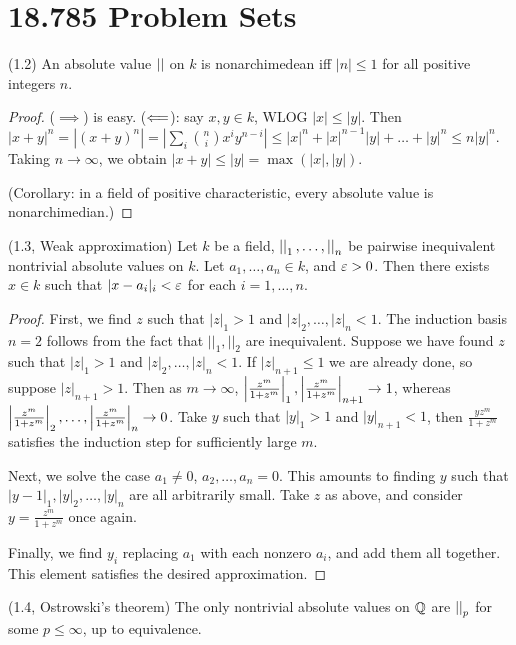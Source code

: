 \documentclass[11pt]{amsart}
\begin{document}
\newpage


\section*{18.785 Problem Sets}


(1.2) An absolute value $\left |  \right |$ on $k$ is nonarchimedean iff $|n|\le 1$ for all positive integers $n$.

\begin{proof}
($\implies$) is easy. ($\Longleftarrow$): say $x,y\in k$, WLOG $|x| \le |y|$. Then $|x+y|^n = |(x+y)^n| = |\sum_i \binom{n}{i} x^i y^{n-i}| \le |x|^n + |x|^{n-1}|y| + \dots + |y|^n \le n|y|^n$. Taking $n\to\infty$, we obtain $|x+y| \le |y| = \max(|x|, |y|)$.

(Corollary: in a field of positive characteristic, every absolute value is nonarchimedian.)
\end{proof}


(1.3, Weak approximation)
Let $k$ be a field, $\left |  \right |_1,\dots, \left |  \right |_n$ be pairwise inequivalent nontrivial absolute values on $k$. Let $a_1,\dots,a_n\in k$, and $\varepsilon>0$. Then there exists $x\in k$ such that $|x-a_i|_i < \varepsilon$ for each $i=1,\dots,n$.

\begin{proof}
First, we find $z$ such that $|z|_1>1$ and $|z|_2,\dots,|z|_n < 1$. The induction basis $n = 2$ follows from the fact that $||_1, ||_2$ are inequivalent. Suppose we have found $z$ such that $|z|_1>1$ and $|z|_2,\dots,|z|_n < 1$. If $|z|_{n+1}\le 1$ we are already done, so suppose $|z|_{n+1} > 1$. Then as $m\to\infty$, $\left | \frac{z^m}{1+z^m} \right |_1, \left | \frac{z^m}{1+z^m} \right |_{n+1} \to 1$, whereas $\left | \frac{z^m}{1+z^m} \right |_2,\dots, \left | \frac{z^m}{1+z^m} \right |_{n} \to 0$. Take $y$ such that $|y|_1>1$ and $|y|_{n+1}<1$, then $\frac{yz^m}{1+z^m}$ satisfies the induction step for sufficiently large $m$.

Next, we solve the case $a_1\neq 0$, $a_2,\dots,a_n = 0$. This amounts to finding $y$ such that $|y-1|_1, |y|_2,\dots,|y|_n$ are all arbitrarily small. Take $z$ as above, and consider $y = \frac{z^m}{1+z^m}$ once again.

Finally, we find $y_i$ replacing $a_1$ with each nonzero $a_i$, and add them all together. This element satisfies the desired approximation.
\end{proof}

(1.4, Ostrowski's theorem)
The only nontrivial absolute values on $\mathbb{Q}$ are $\left |  \right |_p$ for some $p\le \infty$, up to equivalence.
\end{document}
